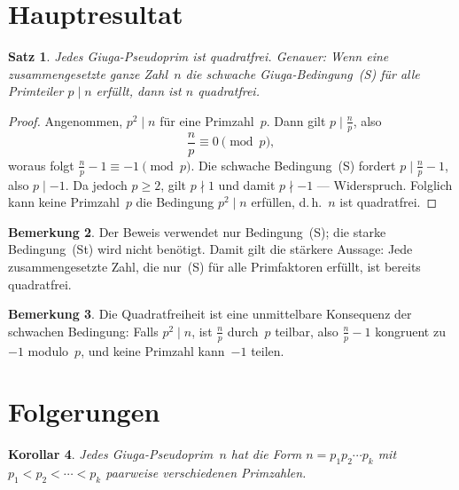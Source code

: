 \documentclass[12pt,a4paper]{amsart}
\newtheorem{theorem}{Satz}[section]
\newtheorem{corollary}[theorem]{Korollar}
\theoremstyle{definition}
\newtheorem{remark}[theorem]{Bemerkung}
\begin{document}
\section{Hauptresultat}

\begin{theorem}
\label{thm:qfrei}
Jedes Giuga-Pseudoprim ist quadratfrei. Genauer: Wenn eine zusammengesetzte ganze Zahl~$n$
die schwache Giuga-Bedingung~\textup{(S)} für alle Primteiler $p \mid n$ erfüllt,
dann ist $n$ quadratfrei.
\end{theorem}

\begin{proof}
Angenommen, $p^2 \mid n$ für eine Primzahl~$p$. Dann gilt $p \mid \tfrac{n}{p}$, also
\[
  \frac{n}{p} \equiv 0 \pmod{p},
\]
woraus folgt $\tfrac{n}{p} - 1 \equiv -1 \pmod{p}$.
Die schwache Bedingung~(S) fordert $p \mid \tfrac{n}{p} - 1$, also $p \mid -1$.
Da jedoch $p \ge 2$, gilt $p \nmid 1$ und damit $p \nmid -1$ — Widerspruch.
Folglich kann keine Primzahl~$p$ die Bedingung $p^2 \mid n$ erfüllen, d.\,h.\ $n$ ist
quadratfrei.
\end{proof}

\begin{remark}
Der Beweis verwendet nur Bedingung~(S); die starke Bedingung~(St) wird nicht benötigt.
Damit gilt die stärkere Aussage: Jede zusammengesetzte Zahl, die nur~(S) für alle
Primfaktoren erfüllt, ist bereits quadratfrei.
\end{remark}

\begin{remark}
Die Quadratfreiheit ist eine unmittelbare Konsequenz der schwachen Bedingung:
Falls $p^2 \mid n$, ist $\tfrac{n}{p}$ durch~$p$ teilbar, also $\tfrac{n}{p} - 1$
kongruent zu~$-1$ modulo~$p$, und keine Primzahl kann~$-1$ teilen.
\end{remark}

\section{Folgerungen}

\begin{corollary}
Jedes Giuga-Pseudoprim~$n$ hat die Form $n = p_1 p_2 \cdots p_k$
mit $p_1 < p_2 < \cdots < p_k$ paarweise verschiedenen Primzahlen.
\end{corollary}
\end{document}
